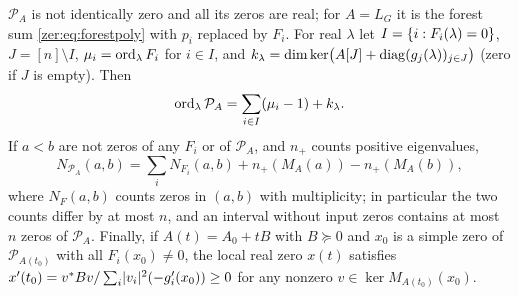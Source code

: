 \begin{theorem}\label{zer:thm:hermitian}
$\mathcal P_A$ is not identically zero and all its zeros are real; for $A=L_G$ it is the forest sum
\eqref{zer:eq:forestpoly} with $p_i$ replaced by $F_i$. For real $\lambda$ let
$I=\{i:F_i(\lambda)=0\}$, $J=[n]\setminus I$, $\mu_i=\operatorname{ord}_\lambda F_i$ for $i\in I$, and
$k_\lambda=\dim\ker\bigl(A[J]+\operatorname{diag}(g_j(\lambda))_{j\in J}\bigr)$ (zero if $J$ is empty). Then
\begin{equation}\label{zer:eq:collision}
 \operatorname{ord}_\lambda\mathcal P_A=\sum_{i\in I}(\mu_i-1)+k_\lambda .
\end{equation}
If $a<b$ are not zeros of any $F_i$ or of $\mathcal P_A$, and $n_+$ counts positive eigenvalues,
\[
 N_{\mathcal P_A}(a,b)=\sum_iN_{F_i}(a,b)+n_+(M_A(a))-n_+(M_A(b)),
\]
where $N_F(a,b)$ counts zeros in $(a,b)$ with multiplicity; in particular the two counts differ by at
most $n$, and an interval without input zeros contains at most $n$ zeros of $\mathcal P_A$. Finally,
if $A(t)=A_0+tB$ with $B\succeq0$ and $x_0$ is a simple zero of $\mathcal P_{A(t_0)}$ with all
$F_i(x_0)\ne0$, the local real zero $x(t)$ satisfies
$x'(t_0)=v^*Bv/\sum_i\lvert v_i\rvert^2(-g_i'(x_0))\ge0$ for any nonzero $v\in\ker M_{A(t_0)}(x_0)$.
\end{theorem}
